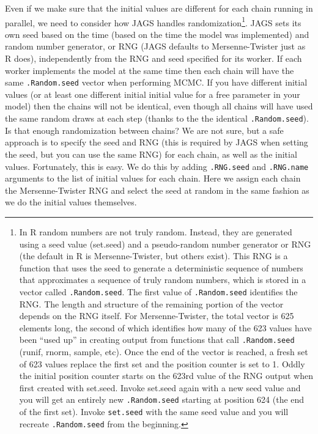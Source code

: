 \documentclass[12pt,english]{article}
\newcommand{\q}[1]{``#1''} %
\begin{document}
Even if we make sure that the initial values are different for each chain running in parallel, we need to consider how JAGS handles randomization\footnote{In R random numbers are not truly random. Instead, they are generated using a seed value (set.seed) and a pseudo-random number generator or RNG (the default in R is Mersenne-Twister, but others exist). This RNG is a function that uses the seed to generate a deterministic sequence of numbers that approximates a sequence of truly random numbers, which is stored in a vector called \texttt{.Random.seed}. The first value of \texttt{.Random.seed} identifies the RNG. The length and structure of the remaining portion of the vector depends on the RNG itself. For Mersenne-Twister, the total vector is 625 elements long, the second of which identifies how many of the 623 values have been \q{used up} in creating output from functions that call \texttt{.Random.seed} (runif, rnorm, sample, etc). Once the end of the vector is reached, a fresh set of 623 values replace the first set and the position counter is set to 1. Oddly the initial position counter starts on the 623rd value of the RNG output when first created with set.seed. Invoke set.seed again with a new seed value and you will get an entirely new \texttt{.Random.seed} starting at position 624 (the end of the first set). Invoke \texttt{set.seed} with the same seed value and you will recreate \texttt{.Random.seed} from the beginning.}. JAGS sets its own seed based on the time (based on the time the model was implemented) and random number generator, or RNG (JAGS defaults to Mersenne-Twister just as R does), independently from the RNG and seed specified for its worker. If each worker implements the model at the same time then each chain will have the same \texttt{.Random.seed} vector when performing MCMC. If you have different initial values (or at least one different initial initial value for a free parameter in your model) then the chains will not be identical, even though all chains will have used the same random draws at each step (thanks to the the identical \texttt{.Random.seed}). Is that enough randomization between chains? We are not sure, but a safe approach is to specify the seed and RNG (this is required by JAGS when setting the seed, but you can use the same RNG) for each chain, as well as the initial values. Fortunately, this is easy. We do this by adding \texttt{.RNG.seed} and \texttt{.RNG.name} arguments to the list of initial values for each chain. Here we assign each chain the Mersenne-Twister RNG and select the seed at random in the same fashion as we do the initial values themselves.
\end{document}
